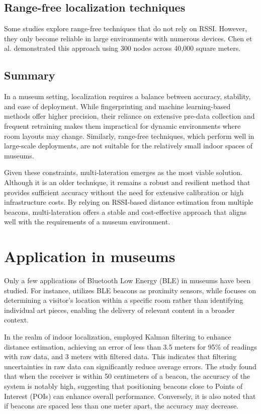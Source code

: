 \subsection{Range-free localization techniques}

Some studies explore range-free techniques that do not rely on RSSI. However, they only become reliable in large environments with numerous devices. Chen et al. \cite{chen_range-free_2013} demonstrated this approach using 300 nodes across 40,000 square meters.  

\subsection{Summary}

In a museum setting, localization requires a balance between accuracy, stability, and ease of deployment. While fingerprinting and machine learning-based methods offer higher precision, their reliance on extensive pre-data collection and frequent retraining makes them impractical for dynamic environments where room layouts may change. Similarly, range-free techniques, which perform well in large-scale deployments, are not suitable for the relatively small indoor spaces of museums.  

Given these constraints, multi-lateration emerges as the most viable solution. Although it is an older technique, it remains a robust and resilient method that provides sufficient accuracy without the need for extensive calibration or high infrastructure costs. By relying on RSSI-based distance estimation from multiple beacons, multi-lateration offers a stable and cost-effective approach that aligns well with the requirements of a museum environment.

\section{Application in museums}

Only a few applications of Bluetooth Low Energy (BLE) in museums have been studied. For instance, \cite{barsocchi_detecting_2021} utilizes BLE beacons as proximity sensors, while \cite{verde_indoor_2023} focuses on determining a visitor's location within a specific room rather than identifying individual art pieces, enabling the delivery of relevant content in a broader context. 

In the realm of indoor localization, \cite{spachos_ble_2020} employed Kalman filtering to enhance distance estimation, achieving an error of less than 3.5 meters for 95\% of readings with raw data, and 3 meters with filtered data. This indicates that filtering uncertainties in raw data can significantly reduce average errors. The study found that when the receiver is within 50 centimeters of a beacon, the accuracy of the system is notably high, suggesting that positioning beacons close to Points of Interest (POIs) can enhance overall performance. Conversely, it is also noted that if beacons are spaced less than one meter apart, the accuracy may decrease.

